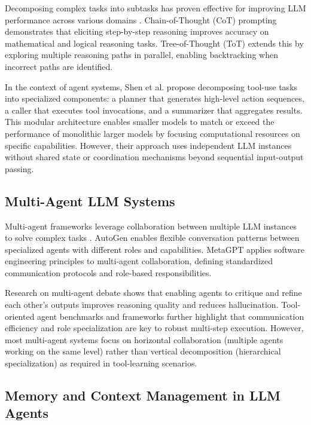 \documentclass[conference]{IEEEtran}
\begin{document}
Decomposing complex tasks into subtasks has proven effective for improving LLM performance across various domains \cite{wei2022chain, yao2024tree}. Chain-of-Thought (CoT) prompting \cite{wei2022chain} demonstrates that eliciting step-by-step reasoning improves accuracy on mathematical and logical reasoning tasks. Tree-of-Thought (ToT) \cite{yao2024tree} extends this by exploring multiple reasoning paths in parallel, enabling backtracking when incorrect paths are identified.

In the context of agent systems, Shen et al. \cite{shen2024small} propose decomposing tool-use tasks into specialized components: a planner that generates high-level action sequences, a caller that executes tool invocations, and a summarizer that aggregates results. This modular architecture enables smaller models to match or exceed the performance of monolithic larger models by focusing computational resources on specific capabilities. However, their approach uses independent LLM instances without shared state or coordination mechanisms beyond sequential input-output passing.

\subsection{Multi-Agent LLM Systems}

Multi-agent frameworks leverage collaboration between multiple LLM instances to solve complex tasks \cite{wu2023autogen, hong2023metagpt}. AutoGen \cite{wu2023autogen} enables flexible conversation patterns between specialized agents with different roles and capabilities. MetaGPT \cite{hong2023metagpt} applies software engineering principles to multi-agent collaboration, defining standardized communication protocols and role-based responsibilities.

Research on multi-agent debate \cite{du2023improving} shows that enabling agents to critique and refine each other's outputs improves reasoning quality and reduces hallucination. Tool-oriented agent benchmarks and frameworks \cite{qin2023toolbench} further highlight that communication efficiency and role specialization are key to robust multi-step execution. However, most multi-agent systems focus on horizontal collaboration (multiple agents working on the same level) rather than vertical decomposition (hierarchical specialization) as required in tool-learning scenarios.

\subsection{Memory and Context Management in LLM Agents}
\end{document}
